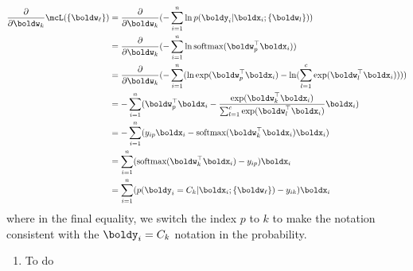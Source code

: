 \documentclass[submit]{harvardml}
\begin{document}
\begin{align*}
\frac{\partial }{\partial \boldw_k} \mcL(\{\boldw_{\ell}\}) &= \frac{\partial }{\partial \boldw_k} (- \sum_{i=1}^n \ln p (\boldy_i |\boldx_i ; \{ \boldw_l \} )) \\
&= \frac{\partial }{\partial \boldw_k} (- \sum_{i=1}^n \ln \text{softmax}(\boldw_p^\top \boldx_i) ) \\
& =\frac{\partial }{\partial \boldw_k} (-\sum_{i = 1}^n (\ln \exp(\boldw_p^\top \boldx_i) - \ln (\sum_{l=1}^c \exp(\boldw_l^\top \boldx_i) ) ) )\\
& = -\sum_{i = 1}^n (\boldw_p^\top \boldx_i -\frac{\exp(\boldw_k^\top \boldx_i) }{\sum_{l=1}^c \exp(\boldw_l^\top \boldx_i)}\boldx_i) \\
&=  -\sum_{i = 1}^n (y_{ip}\boldx_i - \text{softmax}(\boldw_k^\top\boldx_i)\boldx_i ) \\
&= \sum_{i = 1}^n (\text{softmax}(\boldw_k^\top\boldx_i) - y_{ip})\boldx_i \\
&= \sum_{i=1}^n (p(\boldy_i = C_k | \boldx_i; \{\boldw_\ell\}) - y_{ik} ) \boldx_i
\end{align*}
where in the final equality, we switch the index $p$ to $k$ to make the notation consistent with the $\boldy_i = C_k$ notation in the probability.
 
\begin{solution}
\begin{sol}
\begin{enumerate}
\item To do
\end{enumerate}
\end{sol}
\end{solution}
\end{document}
